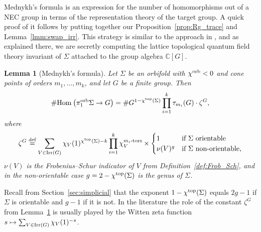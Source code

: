 \documentclass{amsart}
\newtheorem{lemma}[conjecture]{Lemma}
\newcommand{\cho}{\chi^{\textnormal{orb}}}
\newcommand{\cht}{\chi^{\textnormal{top}}}
\newcommand{\defeq}{\stackrel{\tn{def}}{=}}
\newcommand{\Hom}[3][]{\tn{Hom}_{#1}\left(#2\to #3\right)}
\newcommand{\pio}{\pi_1^{\textnormal{orb}}}
\newcommand{\tn}{\textnormal}
\begin{document}
Mednykh's formula \cite{determination_number_nonequiv_coverings_cpct_Riemann_surf_Mednykh78} is an expression for the number of homomorphisms out of a NEC group in terms of the representation theory of the target group. A quick proof of it follows by putting together our Proposition~\ref{prop:Rg_trace} and Lemma~\ref{lmm:swap_irr}. This strategy is similar to the approach in \cite{mednykh_formula_lattice_tqfts_Snyder17}, and as explained there, we are secretly computing the lattice topological quantum field theory invariant of $\Sigma$ attached to the group algebra $\mathbb{C}[G]$.
\begin{lemma}[Mednykh's formula]\label{lmm:Mednykh}
Let $\Sigma$ be an orbifold with $\cho<0$ and cone points of orders $m_1,\dots,m_k$, and let $G$ be a finite group. Then
\begin{equation*}
\#\Hom{\pio\Sigma}{G}=\#G^{1-\cht(\Sigma)}\prod_{i=1}^k\tau_{m_i}(G)\cdot\zeta^G,
\end{equation*}
where
\begin{equation*}
\zeta^G\defeq\sum_{V\in\tn{Irr}(G)}\chi_V(1)^{\cht(\Sigma)-k}\prod_{i=1}^k\chi_V^{m_i\tn{-tors}}\times\begin{cases}1&\text{if }\Sigma\text{ orientable}\\\nu(V)^g&\text{if }\Sigma\text{ non-orientable,}\end{cases}
\end{equation*}
$\nu(V)$ is the Frobenius--Schur indicator of $V$ from Definition~\ref{def:Frob_Sch}, and in the non-orientable case $g=2-\cht(\Sigma)$ is the genus of $\Sigma$.
\end{lemma}
Recall from Section~\ref{sec:simplicial} that the exponent $1-\cht(\Sigma)$ equals $2g-1$ if $\Sigma$ is orientable and $g-1$ if it is not. In the literature the role of the constant $\zeta^G$ from Lemma~\ref{lmm:Mednykh} is usually played by the Witten zeta function $s\mapsto\sum_{V\in\tn{Irr}(G)}\chi_V(1)^{-s}$.
\end{document}
